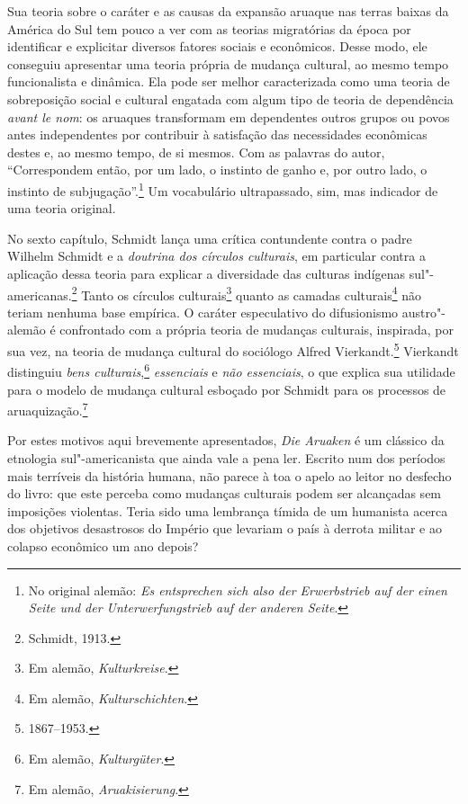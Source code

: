 Sua teoria sobre o caráter e as causas da expansão aruaque nas
terras baixas da América do Sul tem pouco a ver com as teorias
migratórias da época por identificar e explicitar diversos fatores
sociais e econômicos. Desse modo, ele conseguiu apresentar uma teoria
própria de mudança cultural, ao mesmo tempo funcionalista e dinâmica.
Ela pode ser melhor caracterizada como uma teoria de sobreposição
social e cultural engatada com algum tipo de teoria de dependência
\textit{avant le nom}: os aruaques transformam em dependentes outros
grupos ou povos antes independentes por contribuir à satisfação das
necessidades econômicas destes e, ao mesmo tempo, de si mesmos. Com
as palavras do autor, ``Correspondem então, por um lado, o instinto de
ganho e, por outro lado, o instinto de subjugação''.\footnote{No original alemão: \textit{Es entsprechen sich also der Erwerbstrieb auf der einen Seite und der
Unterwerfungstrieb auf der anderen Seite}.} Um vocabulário
ultrapassado, sim, mas indicador de uma teoria original.

No sexto capítulo, Schmidt lança uma crítica contundente contra o padre Wilhelm
Schmidt e a \textit{doutrina dos círculos culturais}, em particular contra a
aplicação dessa teoria para explicar a diversidade das culturas
indígenas sul"-americanas.\footnote{Schmidt, 1913.} Tanto os círculos culturais\footnote{Em alemão, \textit{Kulturkreise}.} quanto as camadas culturais\footnote{Em alemão, \textit{Kulturschichten}.} não teriam nenhuma base empírica. O caráter
especulativo do difusionismo austro"-alemão é confrontado com a própria
teoria de mudanças culturais, inspirada, por sua vez, na teoria de
mudança cultural do sociólogo Alfred Vierkandt.\footnote{1867--1953.} Vierkandt distinguiu \textit{bens culturais},\footnote{Em alemão, \textit{Kulturgüter}.} \textit{essenciais} e \textit{não essenciais}, o que explica
sua utilidade para o modelo de mudança cultural esboçado por Schmidt
para os processos de {aruaquização}.\footnote{Em alemão, \textit{Aruakisierung}.}

Por estes motivos aqui brevemente apresentados, \textit{Die Aruaken} é um clássico da 
etnologia sul"-americanista que ainda
vale a pena ler. Escrito num dos períodos mais terríveis da história
humana, não parece à toa o apelo ao leitor no desfecho do livro: que este perceba como 
mudanças culturais podem ser alcançadas sem
imposições violentas. Teria sido uma lembrança tímida de um humanista
acerca dos objetivos desastrosos do Império que levariam o país à derrota
militar e ao colapso econômico um ano depois?


